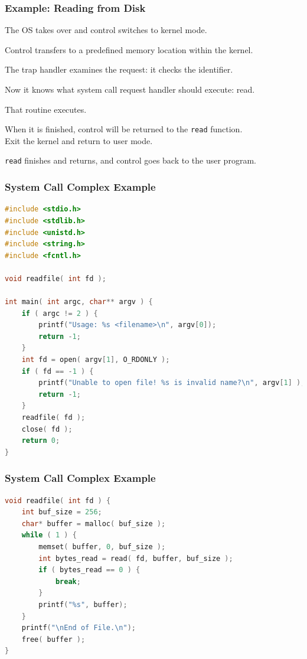 \begin{frame}
\frametitle{Example: Reading from Disk}


The OS takes over and control switches to kernel mode. 

Control transfers to a predefined memory location within the kernel. 

The trap handler examines the request: it checks the identifier. 

Now it knows what system call request handler should execute: read. 

That routine executes. 

When it is finished, control will be returned to the \texttt{read} function.\\
\quad Exit the kernel and return to user mode.

\texttt{read} finishes and returns, and control goes back to the user program.


\end{frame}


\begin{frame}[fragile]
\frametitle{System Call Complex Example}

\begin{lstlisting}[language=C]
#include <stdio.h>
#include <stdlib.h>
#include <unistd.h>
#include <string.h>
#include <fcntl.h>

void readfile( int fd );

int main( int argc, char** argv ) {
    if ( argc != 2 ) {
        printf("Usage: %s <filename>\n", argv[0]);
        return -1;
    }
    int fd = open( argv[1], O_RDONLY );
    if ( fd == -1 ) {
        printf("Unable to open file! %s is invalid name?\n", argv[1] );
        return -1;
    }
    readfile( fd );
    close( fd );
    return 0;
}
\end{lstlisting}
\end{frame}

\begin{frame}[fragile]
\frametitle{System Call Complex Example}

\begin{lstlisting}[language=C]
void readfile( int fd ) {
    int buf_size = 256;
    char* buffer = malloc( buf_size );
    while ( 1 ) {
        memset( buffer, 0, buf_size );
        int bytes_read = read( fd, buffer, buf_size );  
        if ( bytes_read == 0 ) {
            break; 
        }     
        printf("%s", buffer);
    }
    printf("\nEnd of File.\n");
    free( buffer );
}
\end{lstlisting}


\end{frame}


